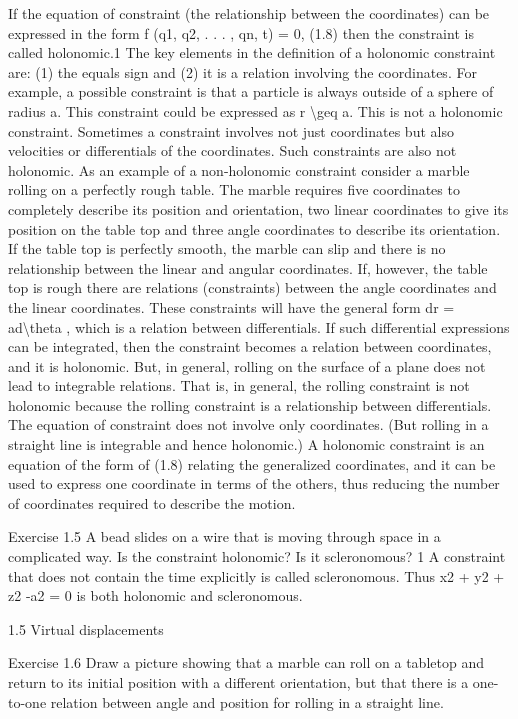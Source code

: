 If the equation of constraint (the relationship between the coordinates) can
be expressed in the form
f (q1, q2, . . . , qn, t) = 0,
(1.8)
then the constraint is called holonomic.1
The key elements in the definition of a holonomic constraint are: (1) the
equals sign and (2) it is a relation involving the coordinates. For example, a possible constraint is that a particle is always outside of a sphere of
radius a. This constraint could be expressed as r \textbackslash{}geq a. This is not a holonomic constraint. Sometimes a constraint involves not just coordinates but
also velocities or differentials of the coordinates. Such constraints are also not
holonomic.
As an example of a non-holonomic constraint consider a marble rolling on
a perfectly rough table. The marble requires five coordinates to completely
describe its position and orientation, two linear coordinates to give its position
on the table top and three angle coordinates to describe its orientation. If the
table top is perfectly smooth, the marble can slip and there is no relationship
between the linear and angular coordinates. If, however, the table top is rough
there are relations (constraints) between the angle coordinates and the linear
coordinates. These constraints will have the general form dr = ad\textbackslash{}theta , which
is a relation between differentials. If such differential expressions can be integrated, then the constraint becomes a relation between coordinates, and it is
holonomic. But, in general, rolling on the surface of a plane does not lead to
integrable relations. That is, in general, the rolling constraint is not holonomic
because the rolling constraint is a relationship between differentials. The equation of constraint does not involve only coordinates. (But rolling in a straight
line is integrable and hence holonomic.)
A holonomic constraint is an equation of the form of (1.8) relating the generalized coordinates, and it can be used to express one coordinate in terms of
the others, thus reducing the number of coordinates required to describe the
motion.
\begin{exercise}
Exercise 1.5 A bead slides on a wire that is moving through space in a
complicated way. Is the constraint holonomic? Is it scleronomous?
1 A constraint that does not contain the time explicitly is called scleronomous. Thus
x2 + y2 + z2 -a2 = 0 is both holonomic and scleronomous.

1.5
Virtual displacements
\end{exercise}

\begin{exercise}
Exercise 1.6 Draw a picture showing that a marble can roll on a tabletop
and return to its initial position with a different orientation, but that there
is a one-to-one relation between angle and position for rolling in a straight
line.
\end{exercise}

